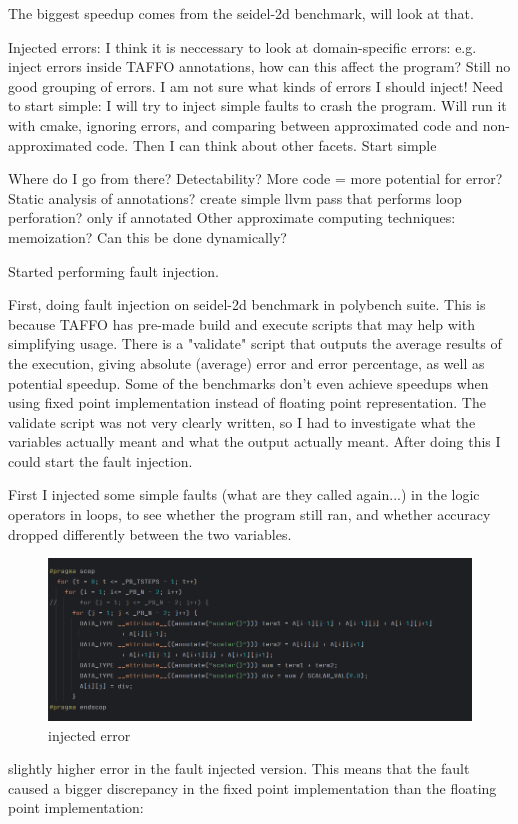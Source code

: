 The biggest speedup comes from the seidel-2d benchmark, will look at that.


Injected errors: I think it is neccessary to look at domain-specific errors: e.g. inject errors inside TAFFO annotations, how can this affect the program? 
Still no good grouping of errors. I am not sure what kinds of errors I should inject! Need to start simple:
I will try to inject simple faults to crash the program. Will run it with cmake, ignoring errors, and comparing between approximated code and non-approximated code. 
Then I can think about other facets. Start simple

Where do I go from there? Detectability? 
More code = more potential for error?
Static analysis of annotations?
create simple llvm pass that performs loop perforation? only if annotated  
    Other approximate computing techniques:
    memoization? Can this be done dynamically?




Started performing fault injection.

First, doing fault injection on seidel-2d benchmark in polybench suite. This is because TAFFO has pre-made build and execute scripts that may help with simplifying usage. 
There is a "validate" script that outputs the average results of the execution, giving absolute (average) error and error percentage, as well as potential speedup. Some of the benchmarks don't even achieve speedups when using fixed point implementation instead of floating point representation.
The validate script was not very clearly written, so I had to investigate what the variables actually meant and what the output actually meant. After doing this I could start the fault injection.

First I injected some simple faults (what are they called again...) in the logic operators in loops, to see whether the program still ran, and whether accuracy dropped differently between the two variables.
\begin{figure}
    \centering
    \includegraphics[width=0.5\linewidth]{Images/injected_basic_error.png}
    \caption{injected error}
    \label{fig:enter-label}
\end{figure}

slightly higher error in the fault injected version. This means that the fault caused a bigger discrepancy in the fixed point implementation than the floating point implementation:

